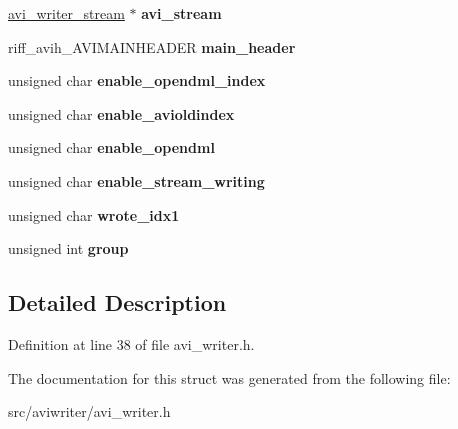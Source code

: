 \begin{DoxyCompactItemize}
\item 
\hypertarget{structavi__writer_a55f25ac16fdee1b49b9f3d7c5945b4e1}{\hyperlink{structavi__writer__stream}{avi\-\_\-writer\-\_\-stream} $\ast$ {\bfseries avi\-\_\-stream}}\label{structavi__writer_a55f25ac16fdee1b49b9f3d7c5945b4e1}

\item 
\hypertarget{structavi__writer_ae45d37b94f464140c7b72d34afc6872f}{riff\-\_\-avih\-\_\-\-A\-V\-I\-M\-A\-I\-N\-H\-E\-A\-D\-E\-R {\bfseries main\-\_\-header}}\label{structavi__writer_ae45d37b94f464140c7b72d34afc6872f}

\item 
\hypertarget{structavi__writer_a86bcbf4355e480c468d022a242c409cd}{unsigned char {\bfseries enable\-\_\-opendml\-\_\-index}}\label{structavi__writer_a86bcbf4355e480c468d022a242c409cd}

\item 
\hypertarget{structavi__writer_a6d6f583c63a41c8bdafab08917be0502}{unsigned char {\bfseries enable\-\_\-avioldindex}}\label{structavi__writer_a6d6f583c63a41c8bdafab08917be0502}

\item 
\hypertarget{structavi__writer_a20a72d9c0c02aad7e29d990a95bbd6ee}{unsigned char {\bfseries enable\-\_\-opendml}}\label{structavi__writer_a20a72d9c0c02aad7e29d990a95bbd6ee}

\item 
\hypertarget{structavi__writer_a782cf8d91dbac349e50a41d235992981}{unsigned char {\bfseries enable\-\_\-stream\-\_\-writing}}\label{structavi__writer_a782cf8d91dbac349e50a41d235992981}

\item 
\hypertarget{structavi__writer_a6aef002eb800b9bc3f8c46514d3a643f}{unsigned char {\bfseries wrote\-\_\-idx1}}\label{structavi__writer_a6aef002eb800b9bc3f8c46514d3a643f}

\item 
\hypertarget{structavi__writer_a67dd537f434d6ed39afce1674de95b34}{unsigned int {\bfseries group}}\label{structavi__writer_a67dd537f434d6ed39afce1674de95b34}

\end{DoxyCompactItemize}


\subsection{Detailed Description}


Definition at line 38 of file avi\-\_\-writer.\-h.



The documentation for this struct was generated from the following file\-:\begin{DoxyCompactItemize}
\item 
src/aviwriter/avi\-\_\-writer.\-h\end{DoxyCompactItemize}
